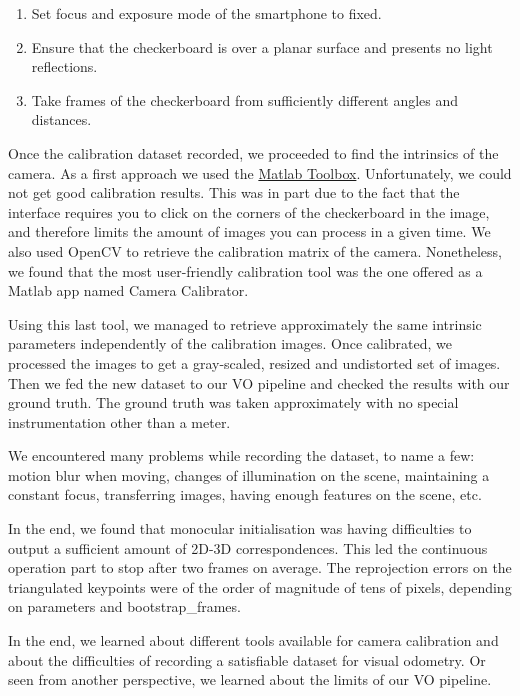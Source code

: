 \begin{enumerate}
	\item Set focus and exposure mode of the smartphone to fixed.
	\item Ensure that the checkerboard is over a planar surface and presents no light reflections.
	\item Take frames of the checkerboard from sufficiently different angles and distances.
\end{enumerate}

Once the calibration dataset recorded, we proceeded to find the intrinsics of the camera.
As a first approach we used the \href{https://www.vision.caltech.edu/bouguetj/calib_doc/}{Matlab Toolbox}.
Unfortunately, we could not get good calibration results.
This was in part due to the fact that the interface requires you to click on the
corners of the checkerboard in the image, and therefore limits the amount of images you can process in a given time.
We also used OpenCV to retrieve the calibration matrix of the camera. Nonetheless, we found that the most user-friendly
calibration tool was the one offered as a Matlab app named Camera Calibrator.

Using this last tool, we managed to retrieve approximately the same intrinsic parameters independently of the calibration images.
Once calibrated, we processed the images to get a gray-scaled, resized and undistorted set of images. Then we fed the new
dataset to our VO pipeline and checked the results with our ground truth.
The ground truth was taken approximately with no special instrumentation other than a meter.

We encountered many problems while recording the dataset, to name a few: motion blur when moving, changes of illumination on the scene,
maintaining a constant focus, transferring images, having enough features on the scene, etc.

In the end, we found that monocular initialisation was having difficulties to output a sufficient amount of 2D-3D correspondences.
This led the continuous operation part to stop after two frames on average. The reprojection errors on the triangulated keypoints were of
the order of magnitude of tens of pixels, depending on parameters and bootstrap\_frames.

In the end, we learned about different tools available for camera calibration and about the difficulties of recording a satisfiable dataset
for visual odometry. Or seen from another perspective, we learned about the limits of our VO pipeline.

